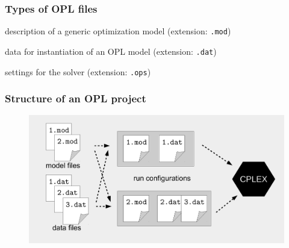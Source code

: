 \begin{frame}
 \frametitle{Types of OPL files}
 \begin{description}
  \item<1-2>[model files] description of a generic optimization model (extension: \texttt{.mod})
  \item<1-2>[data files] data for instantiation of an OPL model (extension: \texttt{.dat})
  \item<1-1>[settings files] settings for the solver (extension: \texttt{.ops})
 \end{description}
\end{frame}

\begin{frame}
 \frametitle{Structure of an OPL project}
 \begin{figure}
  \centering
  \includegraphics[width=\linewidth]{Bilder/OPL-Aufbau2}
 \end{figure}
\end{frame}
